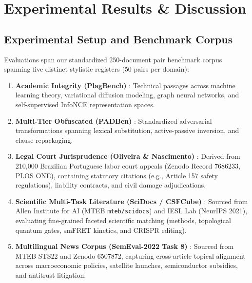 \documentclass[conference,onecolumn,11pt]{IEEEtran}
\begin{document}
\section{Experimental Results \& Discussion}

\subsection{Experimental Setup and Benchmark Corpus}
Evaluations span our standardized 250-document pair benchmark corpus spanning five distinct stylistic registers ($50$ pairs per domain):
\begin{enumerate}
    \item \textbf{Academic Integrity (PlagBench)} \cite{lee2025plagbench}: Technical passages across machine learning theory, variational diffusion modeling, graph neural networks, and self-supervised InfoNCE representation spaces.
    \item \textbf{Multi-Tier Obfuscated (PADBen)} \cite{zha2025padben}: Standardized adversarial transformations spanning lexical substitution, active-passive inversion, and clause repackaging.
    \item \textbf{Legal Court Jurisprudence (Oliveira \& Nascimento)} \cite{oliveira2022legal}: Derived from 210,000 Brazilian Portuguese labor court appeals (Zenodo Record 7686233, PLOS ONE), containing statutory citations (e.g., Article 157 safety regulations), liability contracts, and civil damage adjudications.
    \item \textbf{Scientific Multi-Task Literature (SciDocs / CSFCube)} \cite{cohan2020scidocs, mysore2022scientific}: Sourced from Allen Institute for AI (MTEB \texttt{mteb/scidocs}) and IESL Lab (NeurIPS 2021), evaluating fine-grained faceted scientific matching (methods, topological quantum gates, smFRET kinetics, and CRISPR editing).
    \item \textbf{Multilingual News Corpus (SemEval-2022 Task 8)} \cite{goel2022wolfies}: Sourced from MTEB STS22 and Zenodo 6507872, capturing cross-article topical alignment across macroeconomic policies, satellite launches, semiconductor subsidies, and antitrust litigation.
\end{enumerate}
\end{document}
